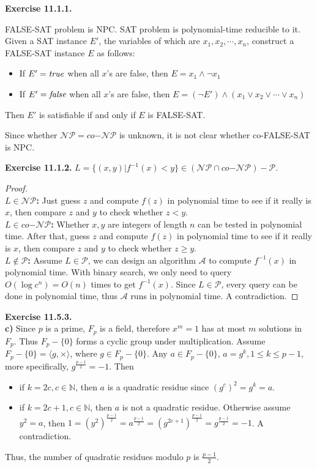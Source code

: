 \documentclass[a4paper]{article}
\newtheorem*{proof}{Proof}
\newenvironment{exercise}[1]{
	\par
	\noindent\textbf{Exercise #1.}\quad
}{
	\par
	\bigskip
}
\newcommand{\Nset}{\mathbb{N}}
\begin{document}
\begin{exercise}{11.1.1}
FALSE-SAT problem is NPC. SAT problem is polynomial-time reducible to it. Given a SAT instance $E'$, the variables of
which are $x_1,x_2,\cdots,x_n$, construct a
FALSE-SAT instance $E$ as follows:
\begin{itemize}
\item If $E'=\it true$ when all $x$'s are false, then $E=x_1\wedge\neg x_1$
\item If $E'=\it false$ when all $x$'s are false, then $E=(\neg E')\wedge(x_1\vee x_2\vee \cdots\vee x_n)$
\end{itemize}
Then $E'$ is satisfiable if and only if $E$ is FALSE-SAT.\par
Since whether $\mathcal{NP}=co\mathcal{-NP}$ is unknown, it is not clear whether co-FALSE-SAT is NPC.
\end{exercise}

\begin{exercise}{11.1.2} $L=\{(x,y)|f^{-1}(x)<y\}\in(\mathcal{NP}\cap co\mathcal{-NP})-\mathcal P$.
\begin{proof}\hspace{0pt}\\
\textbf{$L\in\mathcal{NP}$:} Just guess $z$ and compute $f(z)$ in polynomial time to see if it really is $x$, then
compare $z$ and $y$ to check whether $z<y$.\\
\textbf{$L\in co\mathcal{-NP}$:} Whether $x,y$ are integers of length $n$ can be tested in polynomial time. After
that, guess $z$ and compute $f(z)$ in polynomial time to see if it really is $x$, then
compare $z$ and $y$ to check whether $z\geqslant y$.\\
\textbf{$L\notin\mathcal P$:} Assume $L\in\mathcal P$, we can design an algorithm $\mathcal A$ to compute $f^{-1}(x)$
in polynomial time. With binary search, we only need to query $O(\log c^n)=O(n)$ times to get $f^{-1}(x)$.
Since $L\in\mathcal P$, every query can be done in polynomial time, thus $\mathcal A$ runs in polynomial time. A contradiction.
\end{proof}
\end{exercise}

\begin{exercise}{11.5.3} \hspace{0pt}\\
\textbf{c)} Since $p$ is a prime, $F_p$ is a field, therefore $x^m=1$ has at most $m$ solutions in $F_p$.
Thus $F_p-\{0\}$ forms a cyclic group under multiplication. Assume $F_p-\{0\}=\langle g,\times\rangle$, where $g\in F_p-\{0\}$.
Any $a\in F_p-\{0\}$, $a=g^k,1\leqslant k\leqslant p-1$, more specifically, $g^{\frac{p-1}{2}}=-1$. Then
\begin{itemize}
    \item if $k=2c,c\in\Nset$, then $a$ is a quadratic residue since $(g^c)^2=g^k=a$.
    \item if $k=2c+1,c\in\Nset$, then $a$ is not a quadratic residue. Otherwise assume $y^2=a$, then
        $1=(y^2)^{\frac{p-1}{2}}=a^{\frac{p-1}{2}}=(g^{2c+1})^{\frac{p-1}{2}}=g^{\frac{p-1}{2}}=-1$. A contradiction.
\end{itemize}
    Thus, the number of quadratic residues modulo $p$ is $\frac{p-1}{2}$.
\end{exercise}
\end{document}
